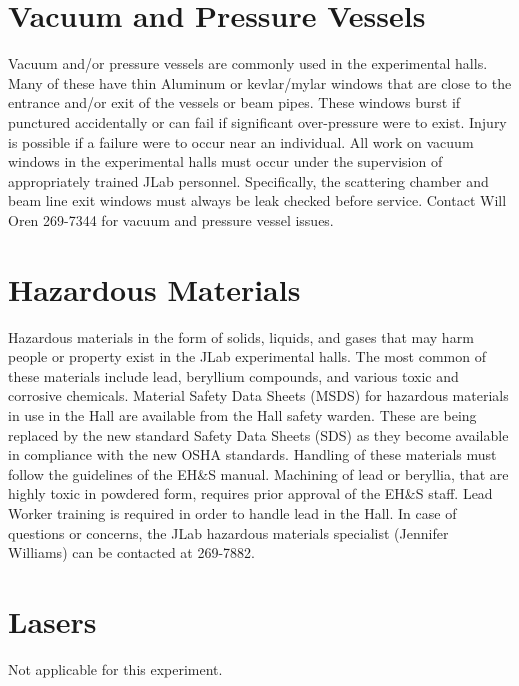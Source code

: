 \section{Vacuum and Pressure Vessels}

	Vacuum and/or pressure vessels are commonly used in the experimental halls. Many 
of these have thin Aluminum or kevlar/mylar windows that are close to the entrance 
and/or exit of the vessels or beam pipes. These windows burst if punctured accidentally 
or can fail if significant over-pressure were to exist. Injury is possible if a failure 
were to occur near an individual. All work on vacuum windows in the experimental halls 
must occur under the supervision of appropriately trained JLab personnel. Specifically, 
the scattering chamber and beam line exit windows must always be leak checked before service. 
Contact Will Oren 269-7344 for vacuum and pressure vessel issues.

\section{Hazardous Materials}

	Hazardous materials in the form of solids, liquids, and gases that may harm people 
or property exist in the JLab experimental halls. The most common of these materials include 
lead, beryllium compounds, and various toxic and corrosive chemicals. 
Material Safety Data Sheets (MSDS) for hazardous materials 
in use in the Hall are available from the Hall safety warden.  These are being replaced by the new standard
Safety Data Sheets (SDS) as they become available in compliance with the new OSHA standards.    Handling of these materials 
must follow the guidelines of the EH\&S manual. Machining of lead or beryllia, that 
are highly toxic in powdered form, requires prior approval of the EH\&S staff. 
Lead Worker training is required in order to handle lead in the Hall. 
In case of questions or concerns, the JLab hazardous materials specialist (Jennifer Williams) can be contacted at 269-7882.

\section{Lasers}

Not applicable for this experiment.


